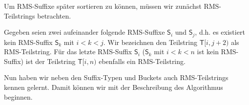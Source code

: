 Um RMS-Suffixe später sortieren zu können, müssen wir zunächst RMS-Teilstrings betrachten.

\begin{definition}
	Gegeben seien zwei aufeinander folgende RMS-Suffixe $\mathsf{S}_i$ und $\mathsf{S}_j$, d.h. es existiert kein RMS-Suffix $\mathsf{S}_k$ mit $i < k < j$. Wir bezeichnen den Teilstring $\mathsf{T}[i, j+2)$ als RMS-Teilstring. Für das letzte RMS-Suffix $\mathsf{S}_i$ ($\mathsf{S}_k$ mit $ i < k < n$ ist kein RMS-Suffix) ist der Teilstring $\mathsf{T}[i, n)$ ebenfalls ein RMS-Teilstring.
\end{definition}

Nun haben wir neben den Suffix-Typen und Buckets auch RMS-Teilstrings kennen gelernt. Damit können wir mit der Beschreibung des Algorithmus beginnen.
